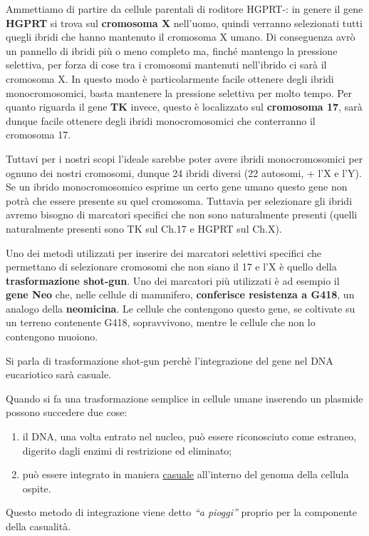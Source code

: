 \documentclass[11pt]{book}
\begin{document}
Ammettiamo di partire da cellule parentali di roditore HGPRT-: in genere il gene \textbf{HGPRT} si trova sul \textbf{cromosoma X} nell’uomo, quindi verranno selezionati tutti quegli ibridi che hanno mantenuto il cromosoma X umano. Di conseguenza avrò un pannello di ibridi più o meno completo ma, finché mantengo la pressione selettiva, per forza di cose tra i cromosomi mantenuti nell'ibrido ci sarà il cromosoma X. In questo modo è particolarmente facile ottenere degli ibridi monocromosomici, basta mantenere la pressione selettiva per molto tempo. Per quanto riguarda il gene \textbf{TK} invece, questo è localizzato sul \textbf{cromosoma 17}, sarà dunque facile ottenere degli ibridi monocromosomici che conterranno il cromosoma 17.
 
Tuttavi per i nostri scopi l’ideale sarebbe poter avere ibridi monocromosomici per ognuno dei nostri cromosomi, dunque 24 ibridi diversi (22 autosomi, + l’X e l’Y). Se un ibrido monocromosomico esprime un certo gene umano questo gene non potrà che essere presente su quel cromosoma.
Tuttavia per selezionare gli ibridi avremo bisogno di marcatori specifici che non sono naturalmente presenti (quelli naturalmente presenti sono TK sul Ch.17 e HGPRT sul Ch.X).

Uno dei metodi utilizzati per inserire dei marcatori selettivi specifici che permettano di selezionare cromosomi che non siano il 17 e l'X è quello della \textbf{trasformazione shot-gun}. Uno dei marcatori più utilizzati è ad esempio il \textbf{gene Neo} che, nelle cellule di mammifero, \textbf{conferisce resistenza a G418}, un analogo della \textbf{neomicina}. Le cellule che contengono questo gene, se coltivate su un terreno contenente G418, sopravvivono, mentre le cellule che non lo contengono muoiono. 

Si parla di trasformazione shot-gun perchè l'integrazione del gene nel DNA eucariotico sarà casuale.

Quando si fa una trasformazione semplice in cellule umane inserendo un plasmide possono succedere due cose:
\begin{enumerate}
\item il DNA, una volta entrato nel nucleo, può essere riconosciuto come estraneo, digerito dagli enzimi di restrizione ed eliminato;
\item può essere integrato in maniera \underline{casuale} all'interno del genoma della cellula ospite.
\end{enumerate}

Questo metodo di integrazione viene detto \emph{``a pioggi''} proprio per la componente della casualità.
\end{document}
